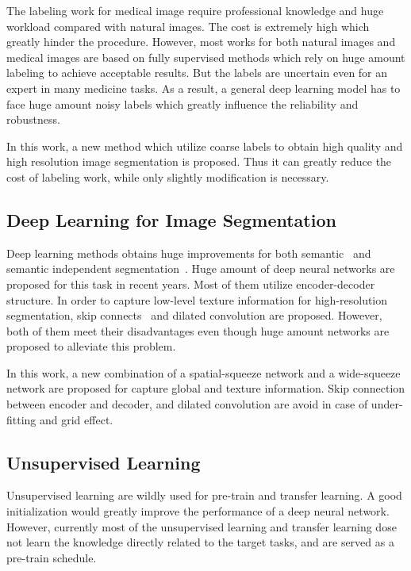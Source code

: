 \documentclass[10pt,twocolumn,letterpaper]{article}
\begin{document}
The labeling work for medical image require professional knowledge and huge workload compared with natural images. The cost is extremely high which greatly hinder the procedure. 
However, most works for both natural images and medical images are based on fully supervised methods which rely on huge amount labeling to achieve acceptable results. 
But the labels are uncertain even for an expert in many medicine tasks. As a result, a general deep learning model has to face huge amount noisy labels which greatly influence the reliability and robustness. 

In this work, a new method which utilize coarse labels to obtain high quality and high resolution image segmentation is proposed. Thus it can greatly reduce the cost of labeling work, while only slightly modification is necessary. 


\subsection{Deep Learning for Image Segmentation}

Deep learning methods obtains huge improvements for both semantic~\cite{Noh_2015_ICCV} and semantic independent segmentation~\cite{he2017mask, hong2015decoupled}. 
Huge amount of deep neural networks are proposed for this task in recent years. 
Most of them utilize encoder-decoder structure. 
In order to capture low-level texture information for high-resolution segmentation, skip connects~\cite{unet} and dilated convolution are proposed. 
However, both of them meet their disadvantages even though huge amount networks are proposed to alleviate this problem. 

In this work, a new combination of a spatial-squeeze network and a wide-squeeze network are proposed for capture global and texture information. 
Skip connection between encoder and decoder, and dilated convolution are avoid in case of under-fitting and grid effect. 

\subsection{Unsupervised Learning}
Unsupervised learning are wildly used for pre-train and transfer learning. A good initialization would greatly improve the performance of a deep neural network. 
However, currently most of the unsupervised learning and transfer learning dose not learn the knowledge directly related to the target tasks, and are served as a pre-train schedule. 
\end{document}
